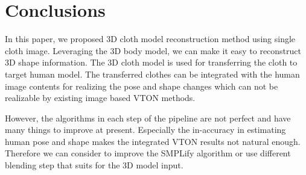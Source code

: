 \documentclass[runningheads]{llncs}
\begin{document}
\section{Conclusions}

In this paper, we proposed 3D cloth model reconstruction method using single cloth image. Leveraging the 3D body model, we can make it easy to reconstruct 3D shape information. The 3D cloth model is used for transferring the cloth to target human model.  The transferred clothes can be integrated with the human image contents for realizing the pose and shape changes which can not be realizable by existing image based VTON methods.

However, the algorithms in each step of the pipeline are not perfect and have many things to improve at present. Especially the in-accuracy in estimating human pose and shape makes the integrated VTON results not natural enough. Therefore we can consider to improve the SMPLify\cite{Bogo2016SMPLify} algorithm or use different blending step that suits for the 3D model input.
     

  
\clearpage
%
%


\end{document}
